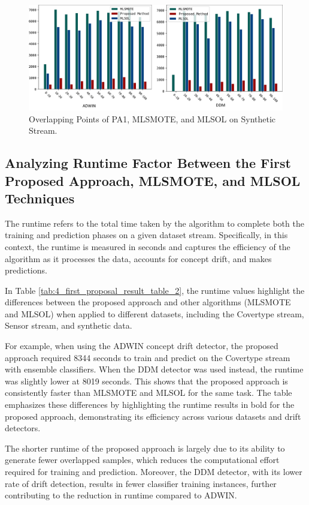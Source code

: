 \begin{figure}[!ht]
	\centering
	\includegraphics[width=1\linewidth]{4_Imbalanced/figures/exp_9.png}
  \caption{Overlapping Points of PA1, MLSMOTE, and MLSOL on Synthetic Stream.}
	\label{fig:4_first_proposal_result_exp_9}
\end{figure}

\subsection{Analyzing Runtime Factor Between the First Proposed Approach, MLSMOTE, and MLSOL Techniques}

The runtime refers to the total time taken by the algorithm to complete both the training and prediction phases on a given dataset stream. Specifically, in this context, the runtime is measured in seconds and captures the efficiency of the algorithm as it processes the data, accounts for concept drift, and makes predictions. 

In Table \ref{tab:4_first_proposal_result_table_2}, the runtime values highlight the differences between the proposed approach and other algorithms (MLSMOTE and MLSOL) when applied to different datasets, including the Covertype stream, Sensor stream, and synthetic data. 

For example, when using the ADWIN concept drift detector, the proposed approach required 8344 seconds to train and predict on the Covertype stream with ensemble classifiers. When the DDM detector was used instead, the runtime was slightly lower at 8019 seconds. This shows that the proposed approach is consistently faster than MLSMOTE and MLSOL for the same task. The table emphasizes these differences by highlighting the runtime results in bold for the proposed approach, demonstrating its efficiency across various datasets and drift detectors.

The shorter runtime of the proposed approach is largely due to its ability to generate fewer overlapped samples, which reduces the computational effort required for training and prediction. Moreover, the DDM detector, with its lower rate of drift detection, results in fewer classifier training instances, further contributing to the reduction in runtime compared to ADWIN.

